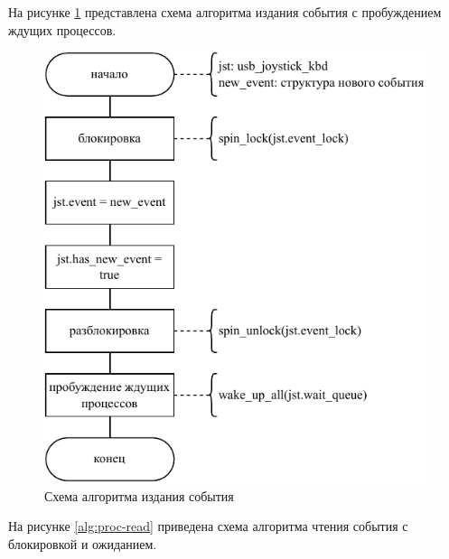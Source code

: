 На рисунке \ref{alg:emit-event} представлена схема алгоритма издания события с пробуждением ждущих процессов.

\begin{figure}[ht]
    \centering
    \includegraphics[keepaspectratio,width=0.75\linewidth,height=0.85\textheight]{img/emit-event.pdf}
    \caption{Схема алгоритма издания события}
    \label{alg:emit-event}
\end{figure}

На рисунке \ref{alg:proc-read} приведена схема алгоритма чтения события с блокировкой и ожиданием.

